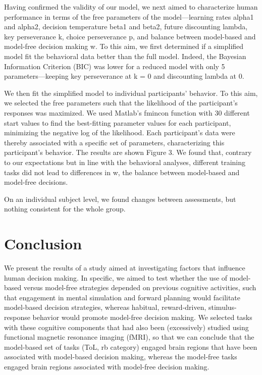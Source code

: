 \documentclass[11pt]{article} %
\begin{document}
Having confirmed the validity of our model, we next aimed to characterize human performance in terms of the free parameters of the model---learning rates alpha1 and alpha2, decision temperature beta1 and beta2, future discounting lambda, key perseverance k, choice perseverance p, and balance between model-based and model-free decision making w. To this aim, we first determined if a simplified model fit the behavioral data better than the full model. Indeed, the Bayesian Information Criterion (BIC) was lower for a reduced model with only 5 parameters---keeping key perseverance at k = 0 and discounting lambda at 0.

We then fit the simplified model to individual participants' behavior. To this aim, we selected the free parameters such that the likelihood of the participant's responses was maximized. We used Matlab's fmincon function with 30 different start values to find the best-fitting parameter values for each participant, minimizing the negative log of the likelihood. Each participant's data were thereby associated with a specific set of parameters, characterizing this participant's behavior. The results are shown Figure 3. We found that, contrary to our expectations but in line with the behavioral analyses, different training tasks did not lead to differences in w, the balance between model-based and model-free decisions. 

On an individual subject level, we found changes between assessments, but nothing consistent for the whole group.

\section{Conclusion}
We present the results of a study aimed at investigating factors that influence human decision making. In specific, we aimed to test whether the use of model-based versus model-free strategies depended on previous cognitive activities, such that engagement in mental simulation and forward planning would facilitate model-based decision strategies, whereas habitual, reward-driven, stimulus-response behavior would promote model-free decision making. We selected tasks with these cognitive components that had also been (excessively) studied using functional magnetic resonance imaging (fMRI), so that we can conclude that the model-based set of tasks (ToL, rb category) engaged brain regions that have been associated with model-based decision making, whereas the model-free tasks engaged brain regions associated with model-free decision making. 
\end{document}
